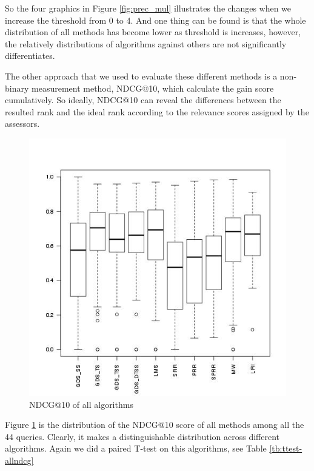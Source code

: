 So the four graphics in Figure \ref{fig:prec_mul} illustrates the changes when we increase the threshold from 0 to 4. And one thing can be found is that the whole distribution of all methods has become lower as threshold is increases, however, the relatively distributions of algorithms against others are not significantly differentiates.

The other approach that we used to evaluate these different methods is a non-binary measurement method, NDCG@10, which calculate the gain score cumulatively. So ideally, NDCG@10 can reveal the differences between the resulted rank and the ideal rank according to the relevance scores assigned by the assessors.

\begin{figure}
\centering
\includegraphics[scale=0.6]{images/ndcg@10}
\caption{NDCG@10 of all algorithms}
\label{fig:ndcg10_dis}
\end{figure} 

Figure \ref{fig:ndcg10_dis} is the distribution of the NDCG@10 score of all methods among all the 44 queries. Clearly, it makes a distinguishable distribution across different algorithms. Again we did a paired T-test on this algorithms, see Table \ref{tb:ttest-allndcg}

